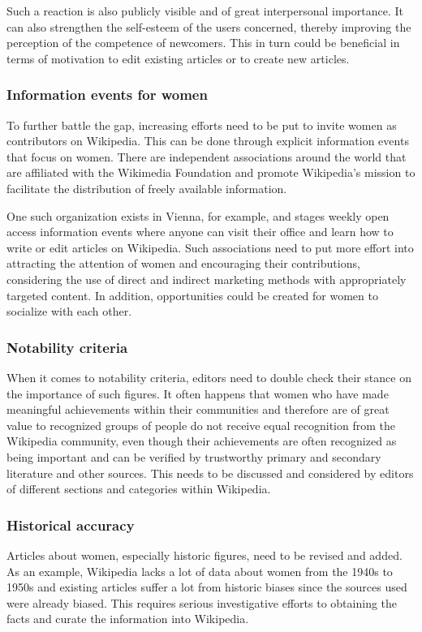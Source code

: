 \documentclass[a4paper, 11pt]{article}
\begin{document}
Such a reaction is also publicly visible and of great interpersonal importance. It can also strengthen the self-esteem of the users concerned, thereby improving the perception of the competence of newcomers. This in turn could be beneficial in terms of motivation to edit existing articles or to create new articles.

\subsubsection{Information events for women} \label{sec:gender-gap-wikipedia:infoevents}
To further battle the gap, increasing efforts need to be put to invite women as contributors on Wikipedia. This can be done through explicit information events that focus on women. There are independent associations around the world that are affiliated with the Wikimedia Foundation and promote Wikipedia's mission to facilitate the distribution of freely available information.

One such organization exists in Vienna, for example, and stages weekly open access information events where anyone can visit their office and learn how to write or edit articles on Wikipedia. Such associations need to put more effort into attracting the attention of women and encouraging their contributions, considering the use of direct and indirect marketing methods with appropriately targeted content. In addition, opportunities could be created for women to socialize with each other.

\subsubsection{Notability criteria} \label{sec:gender-gap-wikipedia:fixnotability}
When it comes to notability criteria, editors need to double check their stance on the importance of such figures. It often happens that women who have made meaningful achievements within their communities and therefore are of great value to recognized groups of people do not receive equal recognition from the Wikipedia community, even though their achievements are often recognized as being important and can be verified by trustworthy primary and secondary literature and other sources. This needs to be discussed and considered by editors of different sections and categories within Wikipedia.

\subsubsection{Historical accuracy} \label{sec:gender-gap-wikipedia:historyaccuracy}
Articles about women, especially historic figures, need to be revised and added. As an example, Wikipedia lacks a lot of data about women from the 1940s to 1950s and existing articles suffer a lot from historic biases since the sources used were already biased. This requires serious investigative efforts to obtaining the facts and curate the information into Wikipedia.
\end{document}
